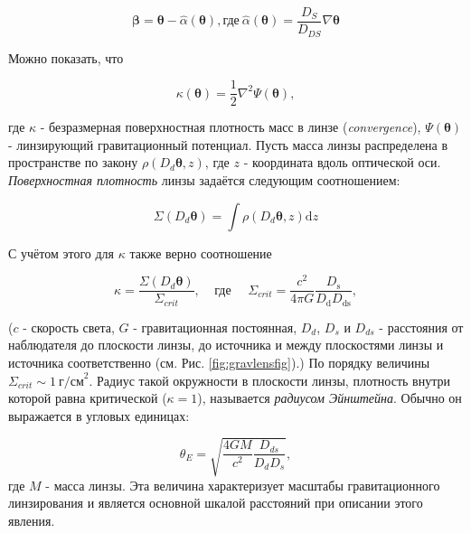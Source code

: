 \begin{equation}\label{nablapsi}
\boldsymbol{\beta} = \boldsymbol{\theta} -  \hat{\alpha}(\boldsymbol{\theta}), \textrm{где} \  \hat{\alpha}(\boldsymbol{\theta}) = \frac{D_S}{D_{DS}}\nabla \boldsymbol{\theta}
\end{equation}



Можно показать, что

\begin{equation}\label{nabla2psi}
\kappa({\boldsymbol{\theta}}) = \frac{1}{2}\nabla^2 \Psi(\boldsymbol{\theta}),
\end{equation}

где $\kappa$  - безразмерная поверхностная плотность масс в линзе  (\textit{convergence}), $\Psi(\boldsymbol{\theta})$ - линзирующий гравитационный потенциал. Пусть масса линзы распределена в пространстве по закону $\rho(D_d \boldsymbol{\theta}, z)$, где $z$ - координата вдоль оптической оси. \textit{Поверхностная плотность} линзы задаётся следующим соотношением:

\begin{equation}\label{sigmasurf}
\Sigma(D_d \boldsymbol{\theta})=\int \rho(D_d \boldsymbol{\theta}, z) \mathrm{d} z
\end{equation}

С учётом этого для $\kappa$ также верно соотношение

\begin{equation}\label{convergence}
\kappa = \frac{\Sigma(D_d \boldsymbol{\theta})}{\Sigma_{crit}}, \ \ \ \ \  \textrm{где} \ \ \ \ \ \ \Sigma_{crit}=\frac{c^{2}}{4 \pi G} \frac{D_{\mathrm{s}}}{D_{\mathrm{d}} D_{\mathrm{ds}}},
\end{equation}

($c$ - скорость света, $G$ - гравитационная постоянная, $D_d$, $D_s$ и $D_{ds}$ - расстояния от наблюдателя до плоскости линзы, до источника и между плоскостями линзы и источника соответственно (см. Рис. \ref{fig:gravlensfig}).) По порядку величины $\Sigma_{crit} \sim 1 \ \textrm{г/см}^2$. Радиус такой окружности в плоскости линзы, плотность внутри которой равна критической ($\kappa =  1$), называется \textit{радиусом Эйнштейна}. Обычно он выражается в угловых единицах: 

\begin{equation}\label{r_ein}
\theta_{E}=\sqrt{\frac{4 G M}{c^{2}} \frac{D_{d s}}{D_{d} D_{s}}},
\end{equation}
где $M$ - масса линзы. Эта величина характеризует масштабы гравитационного линзирования и является основной шкалой расстояний при описании этого явления.

